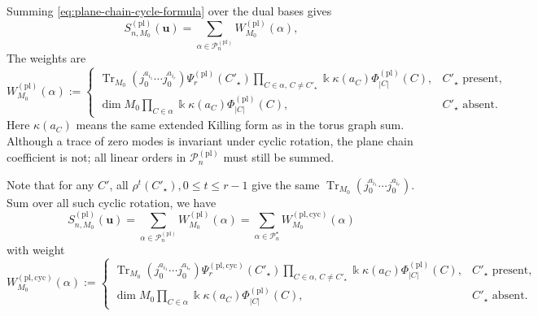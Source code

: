 \documentclass[11pt,a4paper]{amsart}
\numberwithin{equation}{section}
\theoremstyle{definition}
\theoremstyle{remark}
\DeclareMathOperator{\Tr}{Tr}
\newcommand{\kk}{\Bbbk}
\newcommand{\cP}{\mathcal P}
\newcommand{\ubf}{\boldsymbol u}
\begin{document}
Summing \eqref{eq:plane-chain-cycle-formula} over the dual bases gives
\begin{equation}
 S_{n,M_0}^{(\mathrm{pl})}(\ubf)
 =\sum_{\alpha\in\cP_n^{(\mathrm{pl})}}
 W_{M_0}^{(\mathrm{pl})}(\alpha),
 \label{eq:plane-ground-cycle-formula}
\end{equation}
The weights are
\begin{equation}
 W_{M_0}^{(\mathrm{pl})}(\alpha)
 :=\begin{cases}
 \displaystyle
 \Tr_{M_0}(j_0^{a_{i_1}}\cdots j_0^{a_{i_r}})
 \Psi_r^{(\mathrm{pl})}(C'_{\star})
 \prod_{C\in\alpha,\,C\neq C'_{\star}}
 \kk\kappa(a_C)\Phi_{|C|}^{(\mathrm{pl})}(C),
 &C'_\star\text{ present},\\[2ex]
 \displaystyle
 \dim M_0\prod_{C\in\alpha}
 \kk\kappa(a_C)\Phi_{|C|}^{(\mathrm{pl})}(C),
 &C'_{\star}\text{ absent}.
 \end{cases}
 \label{eq:plane-ground-partition-weight}
\end{equation}
Here $\kappa(a_C)$ means the same extended Killing form as in the torus graph sum.  Although a trace of zero modes is invariant under cyclic rotation, the plane chain coefficient is not; all linear orders in $\cP_n^{(\mathrm{pl})}$ must still be summed.

Note that for any $C'$, all $\rho^t(C'_{\star}),0\leq t\leq r-1$ give the same $\Tr_{M_0}(j_0^{a_{i_1}}\cdots j_0^{a_{i_r}})$. Sum over all such cyclic rotation, we have
\begin{equation}
 S_{n,M_0}^{(\mathrm{pl})}(\ubf)
 =\sum_{\alpha\in\cP_n^{(\mathrm{pl})}}
 W_{M_0}^{(\mathrm{pl})}(\alpha)=\sum_{\alpha\in\cP_n^{\star}}
 W_{M_0}^{(\mathrm{pl,cyc})}(\alpha)
\end{equation}
with weight
\begin{equation*}
 W_{M_0}^{(\mathrm{pl,cyc})}(\alpha)
 :=\begin{cases}
 \displaystyle
 \Tr_{M_0}(j_0^{a_{i_1}}\cdots j_0^{a_{i_r}})
 \Psi_r^{(\mathrm{pl,cyc})}(C'_{\star})
 \prod_{C\in\alpha,\,C\neq C'_{\star}}
 \kk\kappa(a_C)\Phi_{|C|}^{(\mathrm{pl})}(C),
 &C'_\star\text{ present},\\[2ex]
 \displaystyle
 \dim M_0\prod_{C\in\alpha}
 \kk\kappa(a_C)\Phi_{|C|}^{(\mathrm{pl})}(C),
 &C'_{\star}\text{ absent}.
 \end{cases}
\end{equation*}
\end{document}
